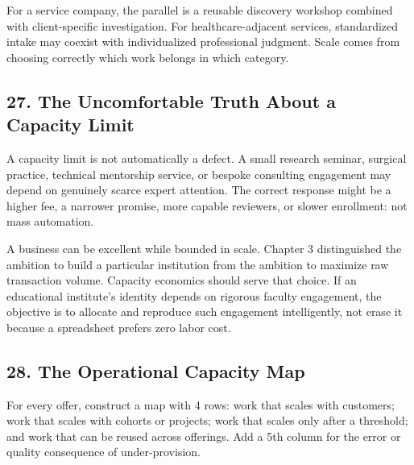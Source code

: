 For a service company, the parallel is a reusable discovery workshop combined with client-specific investigation. For healthcare-adjacent services, standardized intake may coexist with individualized professional judgment. Scale comes from choosing correctly which work belongs in which category.

\subsection*{27. The Uncomfortable Truth About a Capacity Limit}

A capacity limit is not automatically a defect. A small research seminar, surgical practice, technical mentorship service, or bespoke consulting engagement may depend on genuinely scarce expert attention. The correct response might be a higher fee, a narrower promise, more capable reviewers, or slower enrollment: not mass automation.

A business can be excellent while bounded in scale. Chapter 3 distinguished the ambition to build a particular institution from the ambition to maximize raw transaction volume. Capacity economics should serve that choice. If an educational institute's identity depends on rigorous faculty engagement, the objective is to allocate and reproduce such engagement intelligently, not erase it because a spreadsheet prefers zero labor cost.

\subsection*{28. The Operational Capacity Map}

For every offer, construct a map with 4 rows: work that scales with customers; work that scales with cohorts or projects; work that scales only after a threshold; and work that can be reused across offerings. Add a 5th column for the error or quality consequence of under-provision.

